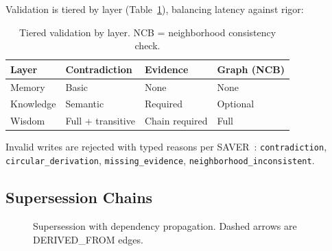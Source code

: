 \documentclass[11pt,letterpaper]{article}
\begin{document}
Validation is tiered by layer (Table~\ref{tab:validation}), balancing latency against rigor:

\begin{table}[H]
\centering
\caption{Tiered validation by layer. NCB = neighborhood consistency check.}
\label{tab:validation}
\begin{tabular}{@{}llll@{}}
\toprule
\textbf{Layer} & \textbf{Contradiction} & \textbf{Evidence} & \textbf{Graph (NCB)} \\
\midrule
Memory & Basic & None & None \\
Knowledge & Semantic & Required & Optional \\
Wisdom & Full + transitive & Chain required & Full \\
\bottomrule
\end{tabular}
\end{table}

Invalid writes are rejected with typed reasons per SAVER~\cite{yuan2026saver}: \texttt{contradiction}, \texttt{circular\_derivation}, \texttt{missing\_evidence}, \texttt{neighborhood\_inconsistent}.

\subsection{Supersession Chains}

\begin{figure}[H]
\centering
{}
\caption{Supersession with dependency propagation. Dashed arrows are \textsf{DERIVED\_FROM} edges.}
\label{fig:supersession}
\end{figure}
\end{document}
